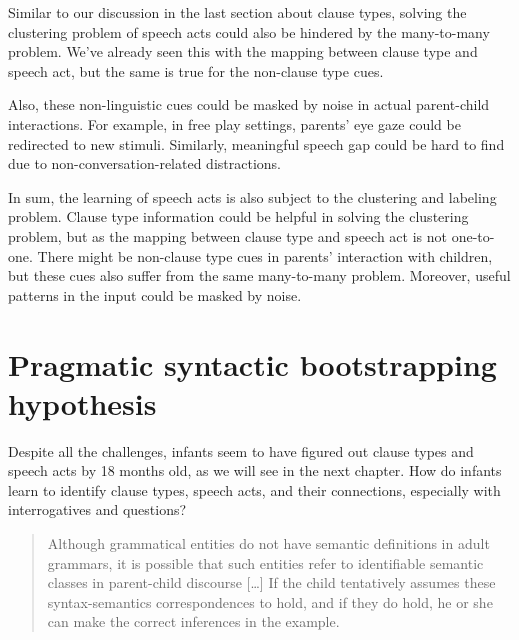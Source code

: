Similar to our discussion in the last section about clause types, solving the clustering problem of speech acts could also be hindered by the many-to-many problem. We've already seen this with the mapping between clause type and speech act, but the same is true for the non-clause type cues. %


Also, these non-linguistic cues could be masked by noise in actual parent-child interactions. For example, in free play settings, parents' eye gaze could be redirected to new stimuli. Similarly, meaningful speech gap could be hard to find due to non-conversation-related distractions. 

In sum, the learning of speech acts is also subject to the clustering and labeling problem. Clause type information could be helpful in solving the clustering problem, but as the mapping between clause type and speech act is not one-to-one. There might be non-clause type cues in parents' interaction with children, but these cues also suffer from the same many-to-many problem. Moreover, useful patterns in the input could be masked by noise. %



\section{Pragmatic syntactic bootstrapping hypothesis}
\label{sec:intro:prag-syn-bootstrap}
Despite all the challenges, infants seem to have figured out clause types and speech acts by 18 months old, as we will see in the next chapter. How do infants learn to identify clause types, speech acts, and their connections, especially with interrogatives and questions?

\begin{quote}
Although grammatical entities do not have semantic definitions in adult grammars, it is possible that such entities refer to identifiable semantic classes in parent-child discourse [\ldots] If the child tentatively assumes these syntax-semantics correspondences to hold, and if they do hold, he or she can make the correct inferences in the example. \textcite[p.39]{pinker1984}
\end{quote}

